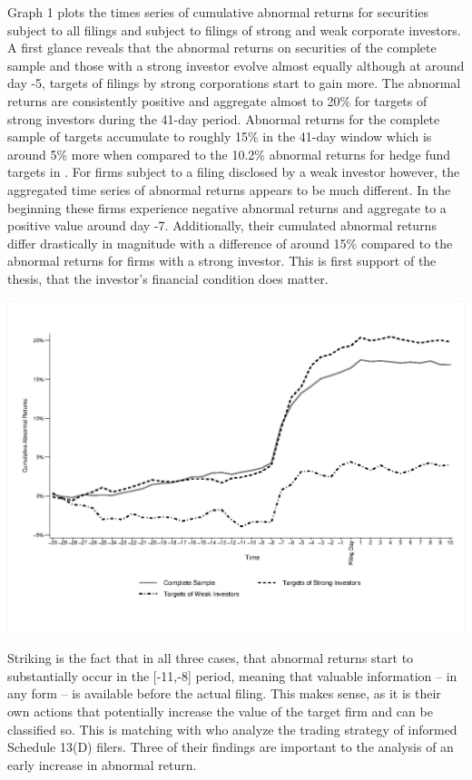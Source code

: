 \documentclass[12pt]{article}
\begin{document}
Graph 1 plots the times series of cumulative abnormal returns for securities subject to all filings and subject to filings of strong and weak corporate investors. A first glance reveals that the abnormal returns on securities of the complete sample and those with a strong investor evolve almost equally although at around day -5, targets of filings by strong corporations start to gain more. The abnormal returns are consistently positive and aggregate almost to 20\% for targets of strong investors during the 41-day period. Abnormal returns for the complete sample of targets accumulate to roughly 15\% in the 41-day window which is around 5\% more when compared to the 10.2\% abnormal returns for hedge fund targets in \citet[p.208]{Klein2009}.
For firms subject to a filing disclosed by a weak investor however, the aggregated time series of abnormal returns  appears to be much different. In the beginning these firms experience negative abnormal returns and aggregate to a positive value around day -7. Additionally, their cumulated abnormal returns differ drastically in magnitude with a difference of around 15\% compared to the abnormal returns for firms with a strong investor. This is first support of the thesis, that the investor's financial condition does matter.\\
\begin{table}
	\centering
	\begin{adjustbox}{max width=\textwidth}
		\includegraphics{Abnormal_Returns_Strong_weak.eps} \label{AR}
	\end{adjustbox}
\end{table}
Striking is the fact that in all three cases, that abnormal returns start to substantially occur in the [-11,-8] period, meaning that valuable information -- in any form -- is available before the actual filing. This makes sense, as it is their own actions that potentially increase the value of the target firm and can be classified so. This is matching with \citet[p.1561]{Collin-Dufresne2015} who analyze the trading strategy of informed Schedule 13(D) filers. Three of their findings are important to the analysis of an early increase in abnormal return. 
\end{document}
